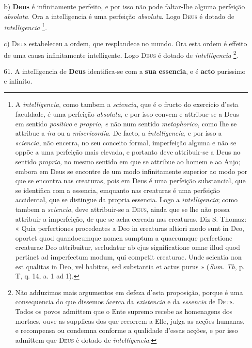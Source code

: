  b) \textbf{Deus} é infinitamente perfeito, e por isso não pode faltar-Ihe alguma perfeição \emph{absoluta}. Ora a intelligencia é uma perfeição \emph{absoluta}. Logo \textsc{Deus} é dotado de \emph{intelligencia} \footnote{A \emph{intelligencia}, como tambem a \emph{sciencia}, que é o fructo do exercicio d'esta faculdade, é uma perfeição \emph{absoluta}, e por isso convem e attribue-se a Deus em sentido \emph{positivo} e \emph{proprio}, \emph{e} não num sentido \emph{metaphorico}, como Ihe se attribue a \emph{ira} ou a \emph{misericordia}. De facto, a \emph{intelligencia}, e por isso a \emph{sciencia}, não encerra, no seu conceito formal, imperfeição alguma e não se oppõe a uma perfeição mais elevada, e portanto deve attribuir-se a Deus no sentido \emph{proprio}, no mesmo sentido em que se attribue ao homem e ao Anjo; embora em Deus se encontre de um modo infinitamente superior ao modo por que se encontra nas creaturas, pois em Deus é uma perfeição substancial, que se identifica com a essencia, emquanto nas creaturas é uma perfeição accidental, que se distingue da propria essencia. Logo a \emph{intelligencia}; como tambem a \emph{sciencia}, deve attribuir-se a \textsc{Deus}, ainda que se lhe não possa attribuir a imperfeição, de que se acha cercada nas creaturas. Diz S. Thomaz: « Quia perfectiones procedentes a Deo in ereaturas altiori modo sunt in Deo, oportet quod quandocumque nomen sumptum a quaecumque perfectione creaturae Deo attribuitur, secludatur ab ejus significatione omne illud quod pertinet ad imperfectum modum, qui competit creaturae. Unde scientia non est qualitas in Deo, vel habitus, sed substantia et actus purus » (\emph{Sum}. \emph{Th}, p. T, q. 14, a. 1 ad 1).}.

 c) \textsc{Deus} estabeleceu a ordem, que resplandece no mundo. Ora esta ordem é effeito de uma causa infinitamente intelligente. Logo \textsc{Deus} é dotado de \emph{intelligencia} \footnote{Não adduzimos mais argumentos em defeza d'esta proposição, porque é uma consequencia do que dissemos ácerca da \emph{existencia} e da \emph{essencia} de \textsc{Deus}. Todos os povos admittem que o Ente supremo recebe as homenagens dos mortaes, ouve as supplicas dos que recorrem a Elle, julga as acções humanas, e recompensa ou condemna conforme a qualidade d'essas acções, e por isso admittem que \textsc{Deus} é dotado de \emph{intelligencia}.}.

61. A intelligencia de \textbf{Deus} identifica-se com a \textbf{sua essencia}, e é \textbf{acto} purissimo e infinito.

